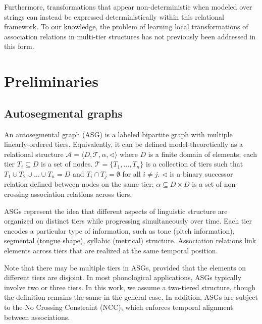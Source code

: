 \documentclass[pmlr]{jmlr}%
\begin{document}
Furthermore, transformations that appear non-deterministic when modeled 
over strings can instead be expressed deterministically within this 
relational framework. To our knowledge, the problem of learning local 
transformations of association relations in multi-tier structures has not previously been addressed in this form.


\section{Preliminaries}
\subsection{Autosegmental graphs}

\begin{definition}
	An autosegmental graph (ASG) is a labeled bipartite graph
	with multiple linearly-ordered tiers. Equivalently, it can be defined
	model-theoretically as a relational structure
	$\mathcal{A} = \langle D, \mathcal{T}, \alpha, \lhd \rangle$
	where $D$ is a finite domain of elements; each tier $T_i \subseteq D$ 
	is a set of nodes. $\mathcal{T} = \{T_1,\dots,T_n\}$ is a collection of tiers such that
	$T_1 \cup T_2 \cup \dots \cup T_n = D$ and $T_i \cap T_j = \emptyset$
	for all $i \neq j$. 
	$\lhd$ is a binary successor relation defined between nodes on the same tier;
	$\alpha \subseteq D \times D$ is a set of non-crossing association relations across tiers.
\end{definition}


ASGs represent the idea that different aspects of linguistic structure
are organized on distinct tiers while progressing simultaneously over time.
Each tier encodes a particular type of information,
such as tone (pitch information), segmental (tongue shape), syllabic
(metrical) structure. Association relations link elements across tiers that are 
realized at the same temporal position.

Note that there may be multiple tiers in ASGs, provided that the 
elements on different tiers are disjoint. In most phonological 
applications, ASGs typically involve two or three tiers. In this 
work, we assume a two-tiered structure, though the definition 
remains the same in the general case. In addition, ASGs are subject 
to the No Crossing Constraint (NCC), which enforces temporal 
alignment between associations.
\end{document}

